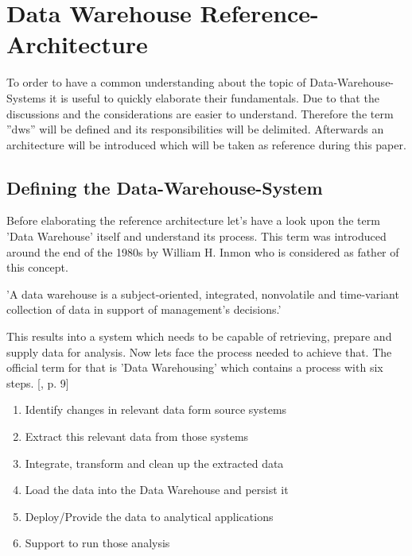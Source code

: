 \section{Data Warehouse Reference-Architecture}
\label{sec:referenceArchitecture}
To order to have a common understanding about the topic of Data-Warehouse-Systems it is useful to quickly elaborate their fundamentals. Due to that the discussions and the considerations are easier to understand.\newline
Therefore the term ''\acrshort{dws}'' will be defined and its responsibilities will be delimited. Afterwards an architecture will be introduced which will be taken as reference during this paper.

\subsection{Defining the Data-Warehouse-System}
Before elaborating the reference architecture let's have a look upon the term 'Data Warehouse' itself and understand its process.\newline
This term was introduced around the end of the 1980s by William H. Inmon who is considered as father of this concept.
\begin{definition}
'A data warehouse is a subject-oriented, integrated, nonvolatile and time-variant collection of data in support of management's decisions.'\cite{buildingTheDWS}
\end{definition}
This results into a system which needs to be capable of retrieving, prepare and supply data for analysis.\newline
Now lets face the process needed to achieve that. The official term for that is 'Data Warehousing' which contains a process with six steps. [\cite{dwsRefArchitecture}, p. 9]
\begin{enumerate}
    \item Identify changes in relevant data form source systems
    \item Extract this relevant data from those systems
    \item Integrate, transform and clean up the extracted data
    \item Load the data into the Data Warehouse and persist it
    \item Deploy/Provide the data to analytical applications 
    \item Support to run those analysis
\end{enumerate}

